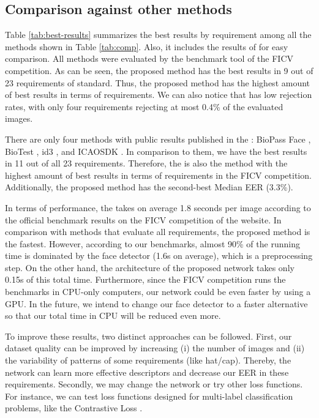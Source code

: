 


\subsection{Comparison against other methods}

Table \ref{tab:best-results} summarizes the best results by requirement among all the methods shown in Table \ref{tab:comp}. Also, it includes the results of \methodname for easy comparison. All methods were evaluated by the benchmark tool of the FICV competition. As can be seen, the proposed method has the best results in 9 out of 23 requirements of \icao standard. Thus, the proposed method has the highest amount of best results in terms of requirements. We can also notice that \methodname has low rejection rates, with only four requirements rejecting at most 0.4\% of the evaluated images. 



There are only four methods with public results published in the \fvcongoing: BioPass Face \citep{fvcVsoft}, BioTest \citep{fvcBioTest}, id3 \citep{fvcICAOCompliance}, and ICAOSDK \citep{fvcSeamfix}. In comparison to them, we have the best results in 11 out of all 23 requirements. Therefore, the \methodname is also the method with the highest amount of best results in terms of requirements in the FICV competition. Additionally, the proposed method has the second-best Median EER (3.3\%).

In terms of performance, the \methodname takes on average 1.8 seconds per image according to the official benchmark results on the FICV competition of the \fvcongoing website. In comparison with methods that evaluate all requirements, the proposed method is the fastest. However, according to our benchmarks, almost 90\% of the \methodname running time is dominated by the face detector (1.6s on average), which is a preprocessing step. On the other hand, the architecture of the proposed network takes only 0.15s of this total time. Furthermore, since the FICV competition runs the benchmarks in CPU-only computers, our network could be even faster by using a GPU. In the future, we intend to change our face detector to a faster alternative so that our total time in CPU will be reduced even more.

To improve these results, two distinct approaches can be followed. First, our dataset quality can be improved by increasing (i) the number of images and (ii) the variability of patterns of some requirements (like hat/cap). Thereby, the network can learn more effective descriptors and decrease our EER in these requirements. Secondly, we may change the network or try other loss functions. For instance, we can test loss functions designed for multi-label classification problems, like the Contrastive Loss \cite{khosla2020supervised}.

